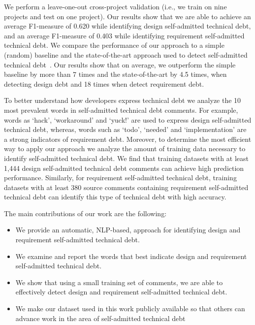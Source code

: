 \documentclass[10pt,journal,compsoc]{IEEEtran}
\newcommand{\SATD}{self-admitted technical debt\xspace}
\begin{document}
We perform a leave-one-out cross-project validation (i.e., we train on nine projects and test on one project). Our results show that we are able to  achieve an average F1-measure of 0.620 while identifying design \SATD, and an average F1-measure of 0.403 while identifying requirement \SATD. We compare the performance of our approach to a simple (random) baseline and the state-of-the-art approach used to detect \SATD~\cite{Potdar2014ICSME}. Our results show that on average, we outperform the simple baseline by more than 7 times and the state-of-the-art by 4.5 times, when detecting design debt and 18 times when detect requirement debt.

To better understand how developers express technical debt we analyze the 10 most prevalent words in \SATD comments. For example, words as `hack', `workaround' and `yuck!' are used to express design \SATD, whereas, words such as `todo', `needed' and `implementation' are a strong indicators of requirement debt. Moreover, to determine the most efficient way to apply our approach we analyze the amount of training data necessary to identify \SATD. We find that training datasets with at least 1,444 design \SATD comments can achieve high prediction performance. Similarly, for requirement \SATD, training datasets with at least 380 source comments containing requirement \SATD can identify this type of technical debt with high accuracy.  

The main contributions of our work are the following:
\begin{itemize}
  \item We provide an automatic, NLP-based, approach for identifying design and requirement \SATD.
  \item We examine and report the words that best indicate design and requirement \SATD.
  \item We show that using a small training set of comments, we are able to effectively detect design and requirement \SATD.
  \item We make our dataset used in this work publicly available so that others can advance work in the area of \SATD
\end{itemize}
\end{document}

